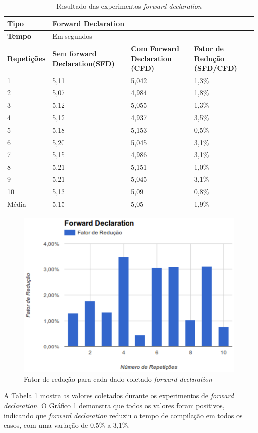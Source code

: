 \begin{table}[!ht]
\centering
\caption{Resultado das experimentos \textit{forward declaration}}
\label{experimento_02}
\begin{tabular}{lp{3cm}p{3cm}p{3cm}}
\toprule
\textbf{Tipo} & \multicolumn{3}{l}{Forward Declaration}\\ \midrule
\textbf{Tempo}& \multicolumn{3}{l}{Em segundos}    \\ \midrule
\textbf{Repetições} & \textbf{Sem forward Declaration(SFD)} & \textbf{Com Forward Declaration (CFD)} & \textbf{Fator de Redução (SFD/CFD)} \\ \midrule
1      & 5,11  & 5,042 & 1,3\% \\ \midrule
2      & 5,07  & 4,984 & 1,8\% \\ \midrule
3      & 5,12  & 5,055 & 1,3\% \\ \midrule
4      & 5,12  & 4,937 & 3,5\% \\ \midrule
5      & 5,18  & 5,153 & 0,5\% \\ \midrule
6      & 5,20  & 5,045 & 3,1\% \\ \midrule
7      & 5,15  & 4,986 & 3,1\% \\ \midrule
8      & 5,21  & 5,151 & 1,0\% \\ \midrule
9      & 5,21  & 5,045 & 3,1\% \\ \midrule
10     & 5,13  & 5,09  & 0,8\% \\ \midrule
Média  & 5,15  & 5,05  & 1,9\% \\ \bottomrule
\end{tabular}
\end{table}


\begin{figure}[h]
    \centering
        \includegraphics[keepaspectratio=true,scale=1]{figuras/forward_declaration.eps}
    \caption{Fator de redução para cada dado coletado \textit{forward declaration}}
    \label{grafico_forward_declaration}
\end{figure}
A Tabela \ref{experimento_02} mostra os valores coletados durante
 os experimentos de \textit{forward declaration}. O Gráfico
 \ref{grafico_forward_declaration} demonstra que todos os valores
 foram positivos, indicando que \textit{forward declaration} reduziu o tempo
 de compilação em todos os casos, com uma variação de 0,5\% a 3,1\%.

